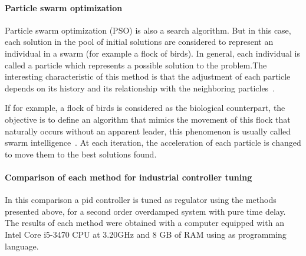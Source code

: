 \paragraph{Particle swarm optimization}
Particle swarm optimization (PSO) is also a search algorithm. But in this case, each solution in the pool of initial solutions are considered to represent an individual in a swarm (for example a flock of birds). In general, each individual is called a particle which represents a possible solution to the problem.The interesting characteristic of this method is that the adjustment of each particle depends on its history and its relationship with the neighboring particles~\citep{Shi2004}.

If for example, a flock of birds is considered as the biological counterpart, the objective is to define an algorithm that mimics the movement of this flock that naturally occurs without an apparent leader, this phenomenon is usually called swarm intelligence~\citep{Kennedy1995}. At each iteration, the acceleration of each particle is changed to move them to the best solutions found.

\paragraph{Comparison of each method for industrial controller tuning}
%
In this comparison a \gls{pid} controller is tuned as regulator using the methods presented above, for a second order overdamped system with pure time delay. The results of each method were obtained with a computer equipped with an Intel Core i5-3470 CPU at 3.20GHz and 8 GB of RAM using \matlab as programming language.

